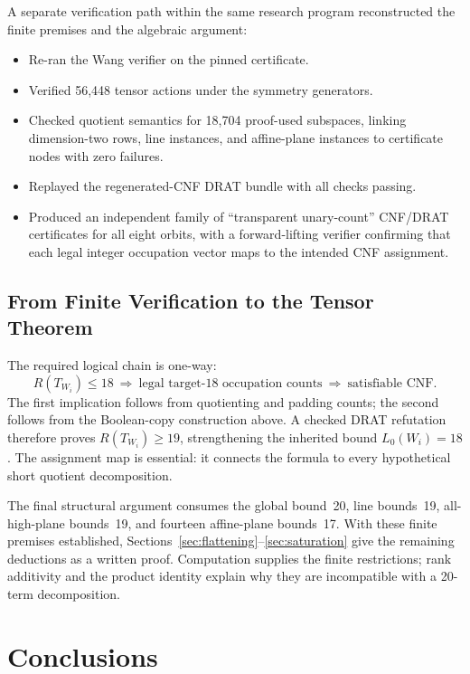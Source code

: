 \documentclass[11pt,a4paper]{article}
\begin{document}
A separate verification path within the same research program reconstructed
the finite premises and the algebraic argument:
\begin{itemize}
  \item Re-ran the Wang verifier on the pinned certificate.
  \item Verified 56,448 tensor actions under the symmetry generators.
  \item Checked quotient semantics for 18,704 proof-used subspaces, linking dimension-two rows, line instances, and affine-plane instances to certificate nodes with zero failures.
  \item Replayed the regenerated-CNF DRAT bundle with all checks passing.
  \item Produced an independent family of ``transparent unary-count'' CNF/DRAT certificates for all eight orbits, with a forward-lifting verifier confirming that each legal integer occupation vector maps to the intended CNF assignment.
\end{itemize}

\subsection{From Finite Verification to the Tensor Theorem}

The required logical chain is one-way:
\begin{equation}\label{eq:finite-proof-implication}
 R(T_{W_i})\le18
 \ \Longrightarrow\ \text{legal target-18 occupation counts}
 \ \Longrightarrow\ \text{satisfiable CNF}.
\end{equation}
The first implication follows from quotienting and padding counts; the
second follows from the Boolean-copy construction above. A checked DRAT
refutation therefore proves $R(T_{W_i})\ge19$, strengthening the inherited
bound $L_0(W_i)=18$. The assignment map is essential: it connects the
formula to every hypothetical short quotient decomposition.

The final structural argument consumes the global bound~20, line
bounds~19, all-high-plane bounds~19, and fourteen affine-plane bounds~17.
With these finite premises established,
Sections~\ref{sec:flattening}--\ref{sec:saturation} give the remaining
deductions as a written proof. Computation supplies the finite
restrictions; rank additivity and the product identity explain why they
are incompatible with a 20-term decomposition.


\section{Conclusions}
\end{document}
